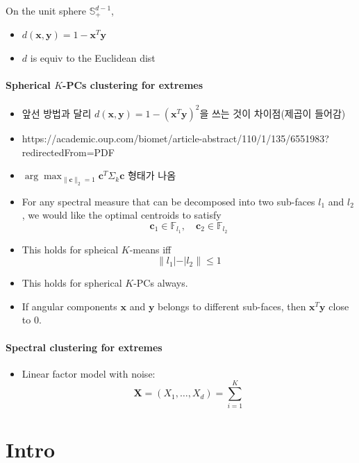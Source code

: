 \documentclass[
  letterpaper,
  DIV=11,
  numbers=noendperiod]{scrreprt}
\providecommand{\tightlist}{%
  \setlength{\itemsep}{0pt}\setlength{\parskip}{0pt}}\usepackage{longtable,booktabs,array}
\theoremstyle{plain}
\theoremstyle{definition}
\theoremstyle{definition}
\theoremstyle{plain}
\theoremstyle{plain}
\theoremstyle{remark}
\begin{document}
On the unit sphere \(\mathbb{S}_{+}^{d-1}\),

\begin{itemize}
\tightlist
\item
  \(d(\pmb{x}, \pmb{y})= 1-\pmb{x}^T\pmb{y}\)
\item
  \(d\) is equiv to the Euclidean dist
\end{itemize}

\subsection{\texorpdfstring{Spherical \(K\)-PCs clustering for
extremes}{Spherical K-PCs clustering for extremes}}\label{spherical-k-pcs-clustering-for-extremes}

\begin{itemize}
\item
  앞선 방법과 달리 \(d(\pmb{x}, \pmb{y}) = 1-(\pmb{x}^T\pmb{y})^2\)을
  쓰는 것이 차이점(제곱이 들어감)
\item
  https://academic.oup.com/biomet/article-abstract/110/1/135/6551983?redirectedFrom=PDF
\item
  \(\arg\max_{\|\pmb{c}\|_2=1} \pmb{c}^T\Sigma_k \pmb{c}\) 형태가 나옴
\item
  For any spectral measure that can be decomposed into two sub-faces
  \(l_1\) and \(l_2\), we would like the optimal centroids to satisfy \[
  \pmb{c}_1 \in \mathbb{F}_{l_1}, \quad{} \pmb{c}_2 \in \mathbb{F}_{l_2}
  \]
\item
  This holds for spheical \(K\)-means iff \[
  \|l_1 | - | l_2 \| \leq 1
  \]
\item
  This holds for spherical \(K\)-PCs always.
\item
  If angular components \(\pmb{x}\) and \(\pmb{y}\) belongs to different
  sub-faces, then \(\pmb{x}^T\pmb{y}\) close to \(0\).
\end{itemize}

\subsection{Spectral clustering for
extremes}\label{spectral-clustering-for-extremes}

\begin{itemize}
\tightlist
\item
  Linear factor model with noise: \[
  \pmb{X} = (X_1, \ldots, X_d) = \sum_{i=1}^K
  \]
\end{itemize}

\part{Intro}
\end{document}
